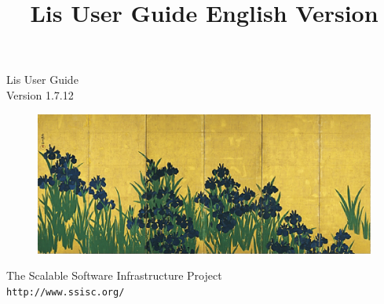 \documentclass[a4paper]{article}
\title{Lis User Guide English Version}
\author{}
\date{}
\begin{document}
\vspace*{4cm}
\begin{flushleft}
{\Large Lis User Guide}\\
Version 1.7.12
\end{flushleft}

\vspace*{2cm}
\begin{figure}[h]
\includegraphics[scale=0.7]{irises_korin.eps}
\end{figure}

\vspace*{2cm}
\begin{flushleft}
{\large The Scalable Software Infrastructure
Project\\
{\tt http://www.ssisc.org/}}\\
\end{flushleft}

\vspace*{5mm}
\thispagestyle{empty}
\end{document}
